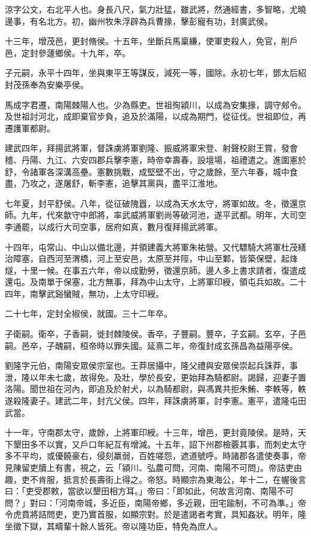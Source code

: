 \begin{pinyinscope}
涼字公文，右北平人也。身長八尺，氣力壯猛，雖武將，然通經書，多智略，尤曉邊事，有名北方。初，幽州牧朱浮辟為兵曹掾，擊彭寵有功，封廣武侯。

十三年，增茂邑，更封脩侯。十五年，坐斷兵馬稟縑，使軍吏殺人，免官，削戶邑，定封參蘧鄉侯。十九年，卒。

子元嗣，永平十四年，坐與東平王等謀反，減死一等，國除。永初七年，鄧太后紹封茂孫奉為安樂亭侯。

馬成字君遷，南陽棘陽人也。少為縣吏。世祖徇潁川，以成為安集掾，調守郟令。及世祖討河北，成即棄官步負，追及於滿陽，以成為期門，從征伐。世祖即位，再遷護軍都尉。

建武四年，拜揚武將軍，督誅虜將軍劉隆、振威將軍宋登、射聲校尉王賞，發會稽、丹陽、九江、六安四郡兵擊李憲，時帝幸壽春，設壇場，祖禮遣之。進圍憲於舒，令諸軍各深溝高壘。憲數挑戰，成堅壁不出，守之歲餘，至六年春，城中食盡，乃攻之，遂屠舒，斬李憲，追擊其黨與，盡平江淮地。

七年夏，封平舒侯。八年，從征破隗囂，以成為天水太守，將軍如故。冬，徵還京師。九年，代來歙守中郎將，率武威將軍劉尚等破河池，遂平武都。明年，大司空李通罷，以成行大司空事，居府如真，數月復拜揚武將軍。

十四年，屯常山、中山以備北邊，并領建義大將軍朱祐營。又代驃騎大將軍杜茂繕治障塞，自西河至渭橋，河上至安邑，太原至井陘，中山至鄴，皆築保壁，起烽燧，十里一候。在事五六年，帝以成勤勞，徵還京師。邊人多上書求請者，復遣成還屯。及南單于保塞，北方無事，拜為中山太守，上將軍印綬，領屯兵如故。二十四年，南擊武谿蠻賊，無功，上太守印綬。

二十七年，定封全椒侯，就國。三十二年卒。

子衛嗣。衛卒，子香嗣，徙封棘陵侯。香卒，子豐嗣。豐卒，子玄嗣。玄卒，子邑嗣。邑卒，子醜嗣，桓帝時以罪失國。延熹二年，帝復封成玄孫昌為益陽亭侯。

劉隆字元伯，南陽安眾侯宗室也。王莽居攝中，隆父禮與安眾侯崇起兵誅莽，事泄，隆以年未七歲，故得免。及壯，學於長安，更始拜為騎都尉。謁歸，迎妻子置洛陽。聞世祖在河內，即追及於射犬，以為騎都尉，與馮異共拒朱鮪、李軼等，軼遂殺隆妻子。建武二年，封亢父侯。四年，拜誅虜將軍，討李憲。憲平，遣隆屯田武當。

十一年，守南郡太守，歲餘，上將軍印綬。十三年，增邑，更封竟陵侯。是時，天下墾田多不以實，又戶口年紀互有增減。十五年，詔下州郡檢覈其事，而刺史太守多不平均，或優饒豪右，侵刻羸弱，百姓嗟怨，遮道號呼。時諸郡各遣使奏事，帝見陳留吏牘上有書，視之，云「潁川、弘農可問，河南、南陽不可問」。帝詰吏由趣，吏不肯服，抵言於長壽街上得之。帝怒。時顯宗為東海公，年十二，在幄後言曰：「吏受郡敕，當欲以墾田相方耳。」帝曰：「即如此，何故言河南、南陽不可問？」對曰：「河南帝城，多近臣，南陽帝鄉，多近親，田宅踰制，不可為準。」帝令虎賁將詰問吏，吏乃實首服，如顯宗對。於是遣謁者考實，具知姦狀。明年，隆坐徵下獄，其疇輩十餘人皆死。帝以隆功臣，特免為庶人。


\end{pinyinscope}

